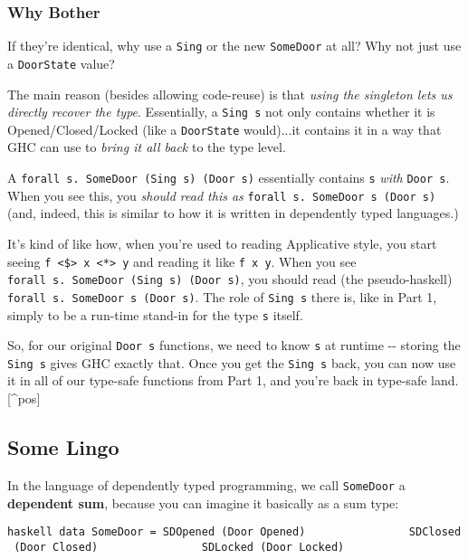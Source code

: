\documentclass[]{article}
\begin{document}
\subsubsection{Why Bother}

If they're identical, why use a \texttt{Sing} or the new \texttt{SomeDoor} at
all? Why not just use a \texttt{DoorState} value?

The main reason (besides allowing code-reuse) is that \emph{using the singleton
lets us directly recover the type}. Essentially, a \texttt{Sing\ s} not only
contains whether it is Opened/Closed/Locked (like a \texttt{DoorState}
would)...it contains it in a way that GHC can use to \emph{bring it all back} to
the type level.

A \texttt{forall\ s.\ SomeDoor\ (Sing\ s)\ (Door\ s)} essentially contains
\texttt{s} \emph{with} \texttt{Door\ s}. When you see this, you \emph{should
read this as} \texttt{forall\ s.\ SomeDoor\ s\ (Door\ s)} (and, indeed, this is
similar to how it is written in dependently typed languages.)

It's kind of like how, when you're used to reading Applicative style, you start
seeing \texttt{f\ \textless{}\$\textgreater{}\ x\ \textless{}*\textgreater{}\ y}
and reading it like \texttt{f\ x\ y}. When you see
\texttt{forall\ s.\ SomeDoor\ (Sing\ s)\ (Door\ s)}, you should read (the
pseudo-haskell) \texttt{forall\ s.\ SomeDoor\ s\ (Door\ s)}. The role of
\texttt{Sing\ s} there is, like in Part 1, simply to be a run-time stand-in for
the type \texttt{s} itself.

So, for our original \texttt{Door\ s} functions, we need to know \texttt{s} at
runtime -\/- storing the \texttt{Sing\ s} gives GHC exactly that. Once you get
the \texttt{Sing\ s} back, you can now use it in all of our type-safe functions
from Part 1, and you're back in type-safe land.{[}\^{}pos{]}

\subsection{Some Lingo}

In the language of dependently typed programming, we call \texttt{SomeDoor} a
\textbf{dependent sum}, because you can imagine it basically as a sum type:

\texttt{haskell\ data\ SomeDoor\ =\ SDOpened\ (Door\ \textquotesingle{}Opened)\ \ \ \ \ \ \ \ \ \ \ \ \ \ \ \textbar{}\ SDClosed\ (Door\ \textquotesingle{}Closed)\ \ \ \ \ \ \ \ \ \ \ \ \ \ \ \textbar{}\ SDLocked\ (Door\ \textquotesingle{}Locked)}
\end{document}
